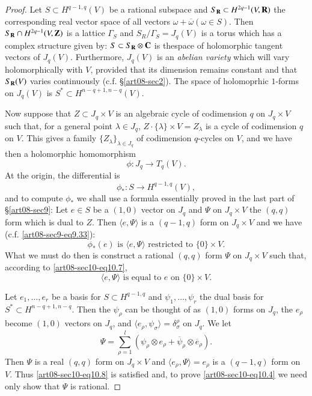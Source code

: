 \begin{proof}
Let $S\subset H^{q-1,q}(V)$ be a rational subspace and $S_{\mathbf{R}}\subset H^{2q-1}(V,\mathbf{R})$ the corresponding real vector space of all vectors $\omega+\overline{\omega}(\omega\in S)$. Then $S_{\mathbf{R}}\cap H^{2q-1}(V,\mathbf{Z})$ is a lattice $\Gamma_{S}$ and $S_{R}/\Gamma_{S}=J_{q}(V)$ is a torus which has a complex structure given by: $S\subset S_{\mathbf{R}}\otimes \mathbf{C}$ is the\pageoriginale space of holomorphic tangent vectors of $J_{q}(V)$. Furthermore, $J_{q}(V)$ is an {\em abelian variety} which will vary holomorphically with $V$, provided that its dimension remains constant and that $S_{\mathbf{R}}(V)$ varies continuously (c.f. \S\ref{art08-sec2}). The space of holomoprhic $1$-forms on $J_{q}(V)$ is $S^{*}\subset H^{n-q+1,n-q}(V)$.

Now suppose that $Z\subset J_{q}\times V$ is an algebraic cycle of codimension $q$ on $J_{q}\times V$ such that, for a general point $\lambda\in J_{q}$, $Z\cdot \{\lambda\}\times V=Z_{\lambda}$ is a cycle of codimension $q$ on $V$. This gives a family $\{Z_{\lambda}\}_{\lambda\in J_{q}}$ of codimension $q$-cycles on $V$, and we have then a holomorphic homomorphism
\begin{equation}
\phi : J_{q}\to T_{q}(V).\label{art08-sec10-eq10.5}
\end{equation}
At the origin, the differential is
\begin{equation}
\phi_{*}:S\to H^{q-1,q}(V),\label{art08-sec10-eq10.6}
\end{equation}
and to compute $\phi_{*}$ we shall use a formula essentially proved in the last part of \S\ref{art08-sec9}: Let $e\in S$ be a $(1,0)$ vector on $J_{q}$ and $\Psi$ on $J_{q}\times V$ the $(q,q)$ form which is dual to $Z$. Then $\langle e,\Psi\rangle$ is a $(q-1,q)$ form on $J_{q}\times V$ and we have (c.f. \eqref{art08-sec9-eq9.33}):
\begin{equation}
\phi_{*}(e)\text{ is } \langle e,\Psi\rangle \text{ restricted to } \{0\}\times V.\label{art08-sec10-eq10.7}
\end{equation}
What we must do then is construct a rational $(q,q)$ form $\Psi$ on $J_{q}\times V$ such that, according to \eqref{art08-sec10-eq10.7},
\begin{equation}
\langle e,\Psi\rangle \text{ is equal to $e$ on } \{0\}\times V.\label{art08-sec10-eq10.8}
\end{equation}

Let $e_{1},\ldots,e_{r}$ be a basis for $S\subset H^{q-1,q}$ and $\psi_{1},\ldots,\psi_{r}$ the dual basis for $S^{*}\subset H^{n-q+1,n-q}$. Then the $\psi_{\rho}$ can be thought of as $(1,0)$ forms on $J_{q}$, the $e_{\rho}$ become $(1,0)$ vectors on $J_{q}$, and $\langle e_{\rho},\psi_{\sigma}\rangle =\delta^{\rho}_{\sigma}$ on $J_{q}$. We let
\begin{equation}
\Psi =\sum\limits^{l}_{\rho=1}(\psi_{\rho}\otimes e_{\rho}+\overline{\psi}_{\rho}\otimes \overline{e}_{\rho}).\label{art08-sec10-eq10.9}
\end{equation}
Then $\Psi$ is a real $(q,q)$ form on $J_{q}\times V$ and $\langle e_{\rho},\Psi\rangle=e_{\rho}$ is a $(q-1,q)$ form on $V$. Thus \eqref{art08-sec10-eq10.8} is satisfied and, to prove \eqref{art08-sec10-eq10.4} we need only show that $\Psi$ is rational.


\end{proof}
